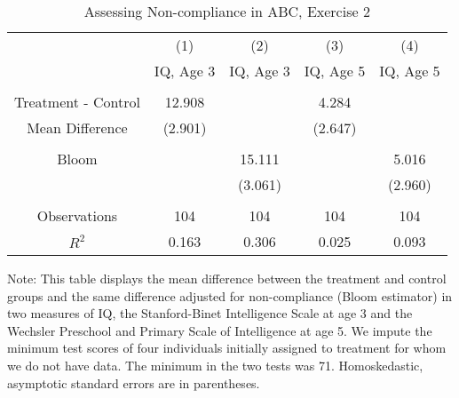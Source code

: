 \begin{table}[H] 
\begin{threeparttable}
\caption{Assessing Non-compliance in ABC, Exercise 2}
\label{table:nc2}
\centering 
\begin{tabular}{ccccc} \toprule
 & (1) & (2) & (3) & (4) \\
 & IQ, Age 3 & IQ, Age 3  & IQ, Age 5 & IQ, Age 5 \\ \midrule
 &  &  & & \\
Treatment - Control & 12.908 &  & 4.284 &  \\
 Mean Difference & (2.901) &  & (2.647) &  \\
  &  &  & & \\
Bloom &  & 15.111 &  & 5.016 \\
 &  & (3.061) &  & (2.960) \\ \\ \midrule
Observations & 104 & 104 & 104 & 104 \\
 $R^2$ & 0.163 & 0.306 & 0.025 & 0.093 \\ \bottomrule
 \end{tabular}
\begin{tablenotes}
\footnotesize
\item Note: This table displays the mean difference between the treatment and control groups and the same difference adjusted for non-compliance (Bloom estimator) in two measures of IQ, the Stanford-Binet Intelligence Scale at age 3 and the Wechsler Preschool and Primary Scale of Intelligence at age 5. We impute the minimum test scores of four individuals initially assigned to treatment for whom we do not have data. The minimum in the two tests was 71. Homoskedastic, asymptotic standard errors are in parentheses.
\end{tablenotes}
\end{threeparttable}
\end{table}


